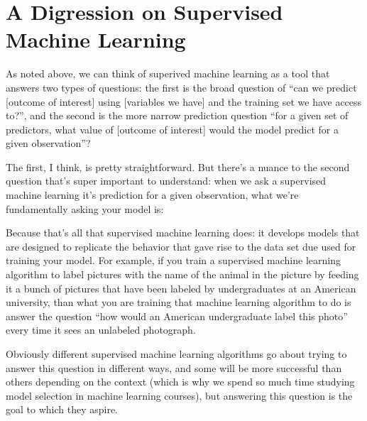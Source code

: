 \documentclass[letterpaper,10pt,english]{jupyterBook}
\begin{document}
\section{A Digression on Supervised Machine Learning}
\label{\detokenize{40_in_practice/00_backwards_design:a-digression-on-supervised-machine-learning}}
\sphinxAtStartPar
As noted above, we can think of superived machine learning as a tool that answers two types of questions: the first is the broad question of “can we predict {[}outcome of interest{]} using {[}variables we have{]} and the training set we have access to?”, and the second is the more narrow prediction question “for a given set of predictors, what value of {[}outcome of interest{]} would the model predict for a given observation”?

\sphinxAtStartPar
The first, I think, is pretty straightforward. But there’s a nuance to the second question that’s super important to understand: when we ask a supervised machine learning it’s prediction for a given observation, what we’re fundamentally asking your model is: 

\sphinxAtStartPar
Because that’s all that supervised machine learning does: it develops models that are designed to replicate the behavior that gave rise to the data set due used for training your model. For example, if you train a supervised machine learning algorithm to label pictures with the name of the animal in the picture by feeding it a bunch of pictures that have been labeled by undergraduates at an American university, than what you are training that machine learning algorithm to do is answer the question “how would an American undergraduate label this photo” every time it sees an unlabeled photograph.

\sphinxAtStartPar
Obviously different supervised machine learning algorithms go about trying to answer this question in different ways, and some will be more successful than others depending on the context (which is why we spend so much time studying model selection in machine learning courses), but answering this question is  the goal to which they aspire.
\end{document}
